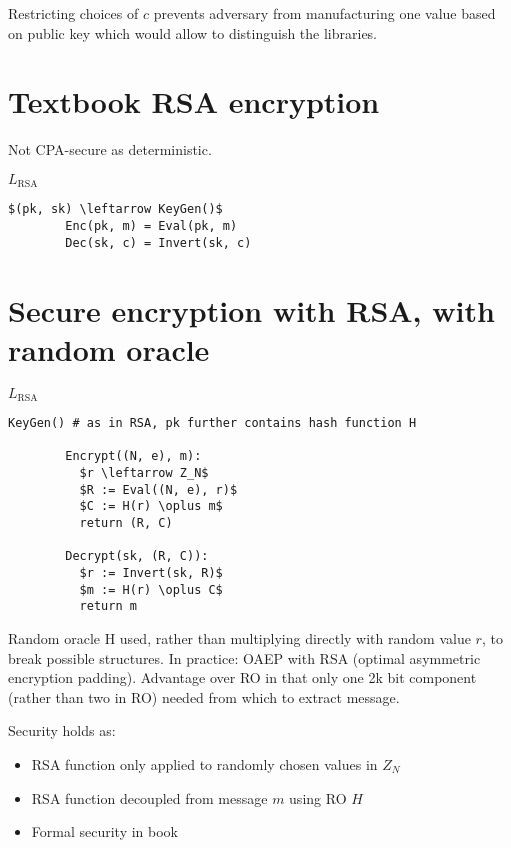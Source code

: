 \documentclass[a4paper]{scrreprt}
\begin{document}
Restricting choices of $c$ prevents adversary from manufacturing one value
based on public key which would allow to distinguish the libraries.

\section{Textbook RSA encryption}

Not CPA-secure as deterministic.

\begin{library}{$L_{\text{RSA}}$}
	\begin{lstlisting}[mathescape=true,autogobble=true]
		$(pk, sk) \leftarrow KeyGen()$
		Enc(pk, m) = Eval(pk, m)
		Dec(sk, c) = Invert(sk, c)
	\end{lstlisting}
\end{library}

\section{Secure encryption with RSA, with random oracle}

\begin{library}{$L_{\text{RSA}}$}
	\begin{lstlisting}[mathescape=true,autogobble=true]
		KeyGen() # as in RSA, pk further contains hash function H

		Encrypt((N, e), m):
		  $r \leftarrow Z_N$
		  $R := Eval((N, e), r)$
		  $C := H(r) \oplus m$
		  return (R, C)

		Decrypt(sk, (R, C)):
		  $r := Invert(sk, R)$
		  $m := H(r) \oplus C$
		  return m
	\end{lstlisting}
\end{library}

Random oracle H used, rather than multiplying directly with random value $r$,
to break possible structures. In practice: OAEP with RSA (optimal asymmetric
encryption padding). Advantage over RO in that only one 2k bit component
(rather than two in RO) needed from which to extract message.

Security holds as:
\begin{itemize}
	\item RSA function only applied to randomly chosen values in $Z_N$
	\item RSA function decoupled from message $m$ using RO $H$
	\item Formal security in book
\end{itemize}
\end{document}
